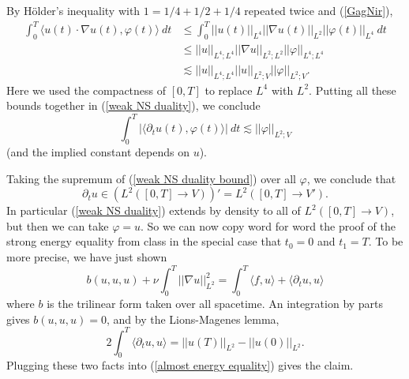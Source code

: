 \documentclass[10pt]{article}
\theoremstyle{definition}
\begin{document}
By H\"older's inequality with $1 = 1/4 + 1/2 + 1/4$ repeated twice and (\ref{GagNir}),
\begin{align*}
\int_0^T \langle u(t) \cdot \nabla u(t), \varphi(t)\rangle ~dt &\leq \int_0^T ||u(t)||_{L^4} ||\nabla u(t)||_{L^2} ||\varphi(t)||_{L^4} ~dt\\
&\leq ||u||_{L^4;L^4} ||\nabla u||_{L^2;L^2} ||\varphi||_{L^4;L^4}\\
&\lesssim ||u||_{L^4;L^4} ||u||_{L^2;V} ||\varphi||_{L^2;V}.
\end{align*}
Here we used the compactness of $[0, T]$ to replace $L^4$ with $L^2$.
Putting all these bounds together in (\ref{weak NS duality}), we conclude
\begin{equation}
\label{weak NS duality bound}
\int_0^T |\langle \partial_t u(t), \varphi(t)\rangle| ~dt \lesssim ||\varphi||_{L^2;V}
\end{equation}
(and the implied constant depends on $u$).

Taking the supremum of (\ref{weak NS duality bound}) over all $\varphi$, we conclude that
$$\partial_t u \in (L^2([0, T] \to V))' = L^2([0, T] \to V').$$
In particular (\ref{weak NS duality}) extends by density to all of $L^2([0, T] \to V)$, but then we can take $\varphi = u$.
So we can now copy word for word the proof of the strong energy equality from class in the special case that $t_0 = 0$ and $t_1 = T$.
To be more precise, we have just shown
\begin{equation}
\label{almost energy equality}
b(u, u, u) + \nu \int_0^T ||\nabla u||_{L^2}^2 = \int_0^T \langle f, u\rangle + \langle \partial_t u, u\rangle
\end{equation}
where $b$ is the trilinear form taken over all spacetime. An integration by parts gives $b(u, u, u) = 0$, and by the Lions-Magenes lemma,
$$2\int_0^T \langle \partial_t u, u\rangle = ||u(T)||_{L^2} - ||u(0)||_{L^2}.$$
Plugging these two facts into (\ref{almost energy equality}) gives the claim.
\end{document}
